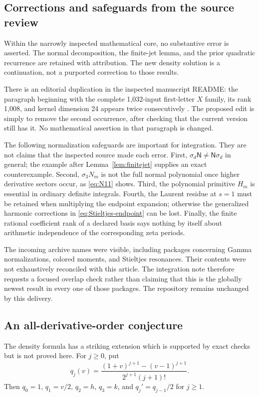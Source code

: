 \documentclass[11pt]{article}
\numberwithin{equation}{section}
\theoremstyle{definition}\newtheorem{definition}[theorem]{Definition}
\theoremstyle{remark}\newtheorem{remark}[theorem]{Remark}
\newcommand{\NF}{\mathsf N}\newcommand{\Prim}{\mathsf H}
\begin{document}
\subsection{Corrections and safeguards from the source review}
Within the narrowly inspected mathematical core, no substantive error is
asserted. The normal decomposition, the finite-jet lemma, and the prior
quadratic recurrence are retained with attribution. The new density
solution is a continuation, not a purported correction to those results.

There is an editorial duplication in the inspected manuscript README:
the paragraph beginning with the complete 1,032-input first-letter $X$
family, its rank 1,008, and kernel dimension 24 appears twice
consecutively \cite{RepoMain}. The proposed edit is simply to remove the
second occurrence, after checking that the current version still has it.
No mathematical assertion in that paragraph is changed.

The following normalization safeguards are important for integration.
They are not claims that the inspected source made each error. First,
$\sigma_d\NF\ne\NF\sigma_d$ in general; the example after
Lemma~\ref{lem:finitejet} supplies an exact counterexample. Second,
$\sigma_3N_m$ is not the full normal polynomial once higher derivative
sectors occur, as \eqref{eq:N11} shows. Third, the polynomial primitive
$H_m$ is essential in ordinary definite integrals. Fourth, the Laurent
residue at $s=1$ must be retained when multiplying the endpoint expansion;
otherwise the generalized harmonic corrections in
\eqref{eq:Stieltjes-endpoint} can be lost. Finally, the finite rational
coefficient rank of a declared basis says nothing by itself about
arithmetic independence of the corresponding zeta periods.

The incoming archive names were visible, including packages concerning
Gamma normalizations, colored moments, and Stieltjes resonances. Their
contents were not exhaustively reconciled with this article. The
integration note therefore requests a focused overlap check rather than
claiming that this is the globally newest result in every one of those
packages. The repository remains unchanged by this delivery.

\subsection{An all-derivative-order conjecture}
\label{sec:conjecture}
The density formula has a striking extension which is supported by exact
checks but is not proved here. For $j\ge0$, put
\begin{equation}\label{eq:qj}
 q_j(v)=\frac{(1+v)^{j+1}-(v-1)^{j+1}}
               {2^{j+1}(j+1)!}.
\end{equation}
Then $q_0=1$, $q_1=v/2$, $q_2=h$, $q_3=k$, and
$q_j'=q_{j-1}/2$ for $j\ge1$.
\end{document}
